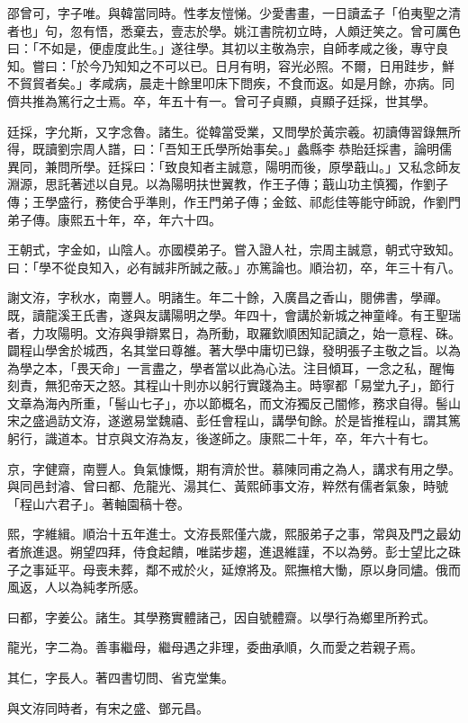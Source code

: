 \begin{pinyinscope}
邵曾可，字子唯。與韓當同時。性孝友愷悌。少愛書畫，一日讀孟子「伯夷聖之清者也」句，忽有悟，悉棄去，壹志於學。姚江書院初立時，人頗迂笑之。曾可厲色曰：「不如是，便虛度此生。」遂往學。其初以主敬為宗，自師孝咸之後，專守良知。嘗曰：「於今乃知知之不可以已。日月有明，容光必照。不爾，日用跬步，鮮不貿貿者矣。」孝咸病，晨走十餘里叩床下問疾，不食而返。如是月餘，亦病。同儕共推為篤行之士焉。卒，年五十有一。曾可子貞顯，貞顯子廷採，世其學。

廷採，字允斯，又字念魯。諸生。從韓當受業，又問學於黃宗羲。初讀傳習錄無所得，既讀劉宗周人譜，曰：「吾知王氏學所始事矣。」蠡縣李恭貽廷採書，論明儒異同，兼問所學。廷採曰：「致良知者主誠意，陽明而後，原學蕺山。」又私念師友淵源，思託著述以自見。以為陽明扶世翼教，作王子傳；蕺山功主慎獨，作劉子傳；王學盛行，務使合乎準則，作王門弟子傳；金鉉、祁彪佳等能守師說，作劉門弟子傳。康熙五十年，卒，年六十四。

王朝式，字金如，山陰人。亦國模弟子。嘗入證人社，宗周主誠意，朝式守致知。曰：「學不從良知入，必有誠非所誠之蔽。」亦篤論也。順治初，卒，年三十有八。

謝文洊，字秋水，南豐人。明諸生。年二十餘，入廣昌之香山，閱佛書，學禪。既，讀龍溪王氏書，遂與友講陽明之學。年四十，會講於新城之神童峰。有王聖瑞者，力攻陽明。文洊與爭辯累日，為所動，取羅欽順困知記讀之，始一意程、硃。闢程山學舍於城西，名其堂曰尊雒。著大學中庸切已錄，發明張子主敬之旨。以為為學之本，「畏天命」一言盡之，學者當以此為心法。注目傾耳，一念之私，醒悔刻責，無犯帝天之怒。其程山十則亦以躬行實踐為主。時寧都「易堂九子」，節行文章為海內所重，「髻山七子」，亦以節概名，而文洊獨反己闇修，務求自得。髻山宋之盛過訪文洊，遂邀易堂魏禧、彭任會程山，講學旬餘。於是皆推程山，謂其篤躬行，識道本。甘京與文洊為友，後遂師之。康熙二十年，卒，年六十有七。

京，字健齋，南豐人。負氣慷慨，期有濟於世。慕陳同甫之為人，講求有用之學。與同邑封濬、曾曰都、危龍光、湯其仁、黃熙師事文洊，粹然有儒者氣象，時號「程山六君子」。著軸園稿十卷。

熙，字維緝。順治十五年進士。文洊長熙僅六歲，熙服弟子之事，常與及門之最幼者旅進退。朔望四拜，侍食起饋，唯諾步趨，進退維謹，不以為勞。彭士望比之硃子之事延平。母喪未葬，鄰不戒於火，延燎將及。熙撫棺大慟，原以身同燼。俄而風返，人以為純孝所感。

曰都，字姜公。諸生。其學務實體諸己，因自號體齋。以學行為鄉里所矜式。

龍光，字二為。善事繼母，繼母遇之非理，委曲承順，久而愛之若親子焉。

其仁，字長人。著四書切問、省克堂集。

與文洊同時者，有宋之盛、鄧元昌。


\end{pinyinscope}
